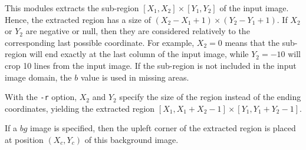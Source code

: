 This modules extracts the sub-region $[X_1,X_2]\times [Y_1,Y_2]$ 
of the input image. Hence, the extracted region has a size of 
$(X_2-X_1+1) \times (Y_2-Y_1+1)$.
If $X_2$ or $Y_2$ are negative or null, then they
are considered relatively to the corresponding 
last possible coordinate. For example, $X_2=0$ means that the sub-region 
will end exactly at the last column of the input image, while $Y_2=-10$
will crop 10 lines from the input image. If the sub-region is
not included in the input image domain, the $b$ value is used in
missing areas.

\medskip

With the \verb+-r+ option, $X_2$ and $Y_2$ specify the
size of the region instead
of the ending coordinates, yielding the extracted region
$[X_1,X_1+X_2-1]\times [Y_1,Y_1+Y_2-1]$.

\medskip

If a $bg$ image is specified, then the upleft corner of the
extracted region is placed at position $(X_c,Y_c)$ of this 
background image.

